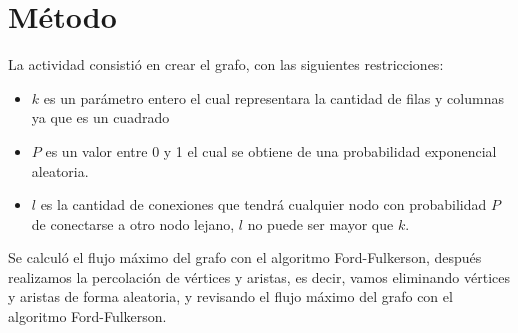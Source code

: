 \documentclass[12pt,letterpaper]{article}
\begin{document}
\section*{Método}
La actividad consistió en crear el grafo, con las siguientes restricciones:
\begin{itemize}
 \item $k$ es un parámetro entero el cual representara la cantidad de filas y columnas ya que es un cuadrado
 \item $P$ es un valor entre 0 y 1 el cual se obtiene de una probabilidad exponencial aleatoria.
 \item $l$ es la cantidad de conexiones que tendrá cualquier nodo con probabilidad $P$ de conectarse a otro nodo lejano, $l$ no puede ser mayor que $k$.
\end{itemize}
Se calculó el flujo máximo del grafo con el algoritmo Ford-Fulkerson, después realizamos la percolación\cite{Percolacion} de vértices y aristas, es decir, vamos eliminando vértices y aristas de forma aleatoria, y revisando el flujo máximo del grafo con el algoritmo Ford-Fulkerson.
\end{document}
